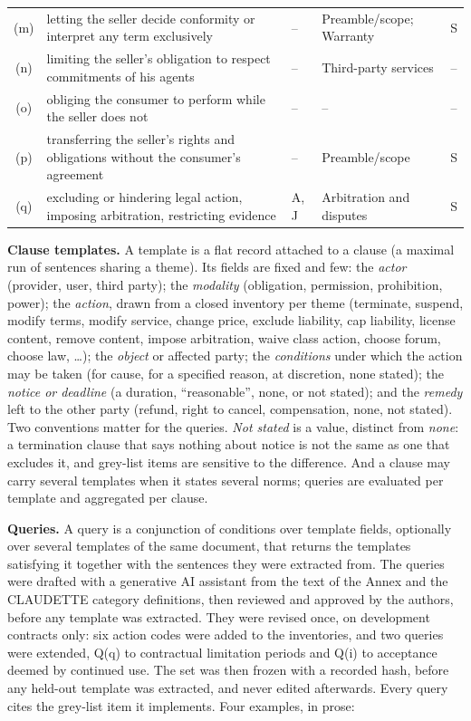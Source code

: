 \documentclass{IOS-Book-Article}
\newcommand{\corpus}{CLAUDETTE}
\begin{document}
\begin{table}[t]
\begin{tabular}{@{}c p{5.3cm} p{1.75cm} p{2.7cm} c@{}}
(m) & letting the seller decide conformity or interpret any term exclusively & -- & Preamble/scope; Warranty & S \\
(n) & limiting the seller's obligation to respect commitments of his agents & -- & Third-party services & -- \\
(o) & obliging the consumer to perform while the seller does not & -- & -- & -- \\
(p) & transferring the seller's rights and obligations without the consumer's agreement & -- & Preamble/scope & S \\
(q) & excluding or hindering legal action, imposing arbitration, restricting evidence & A, J & Arbitration and disputes & S \\
\bottomrule
\end{tabular}
\end{table}

\textbf{Clause templates.} A template is a flat record attached to a clause (a maximal run of sentences sharing a theme). Its fields are fixed and few: the \emph{actor} (provider, user, third party); the \emph{modality} (obligation, permission, prohibition, power); the \emph{action}, drawn from a closed inventory per theme (terminate, suspend, modify terms, modify service, change price, exclude liability, cap liability, license content, remove content, impose arbitration, waive class action, choose forum, choose law, \ldots); the \emph{object} or affected party; the \emph{conditions} under which the action may be taken (for cause, for a specified reason, at discretion, none stated); the \emph{notice or deadline} (a duration, ``reasonable'', none, or not stated); and the \emph{remedy} left to the other party (refund, right to cancel, compensation, none, not stated). Two conventions matter for the queries. \emph{Not stated} is a value, distinct from \emph{none}: a termination clause that says nothing about notice is not the same as one that excludes it, and grey-list items are sensitive to the difference. And a clause may carry several templates when it states several norms; queries are evaluated per template and aggregated per clause.

\textbf{Queries.} A query is a conjunction of conditions over template fields, optionally over several templates of the same document, that returns the templates satisfying it together with the sentences they were extracted from. The queries were drafted with a generative AI assistant from the text of the Annex and the \corpus{} category definitions, then reviewed and approved by the authors, before any template was extracted. They were revised once, on development contracts only: six action codes were added to the inventories, and two queries were extended, Q(q) to contractual limitation periods and Q(i) to acceptance deemed by continued use. The set was then frozen with a recorded hash, before any held-out template was extracted, and never edited afterwards. Every query cites the grey-list item it implements. Four examples, in prose:
\end{document}
